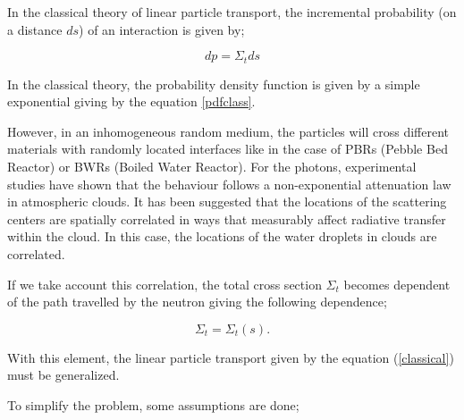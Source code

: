 \documentclass[a4paper, 12pt]{report}
\begin{document}
In the classical theory of linear particle transport, the incremental probability (on a distance $ds$) of an interaction is given by;

\begin{equation}
dp = \Sigma_t ds
\end{equation}

In the classical theory, the probability density function is given by a simple exponential giving by the equation \ref{pdfclass}.

However, in an inhomogeneous random medium, the particles will cross different materials with randomly located interfaces like in the case of PBRs (Pebble Bed Reactor) or BWRs (Boiled Water Reactor). For the photons, experimental studies have shown that the behaviour follows a non-exponential attenuation law in atmospheric clouds. It has been suggested that the locations of the scattering centers are spatially correlated in ways that measurably affect radiative transfer within the cloud. In this case, the locations of the water droplets in clouds are correlated.

If we take account this correlation, the total cross section $\Sigma_t$ becomes dependent of the path travelled by the neutron giving the following dependence;

\begin{equation}
\Sigma_t = \Sigma_t(s).
\end{equation}

With this element, the linear particle transport given by the equation (\ref{classical}) must be generalized.

To simplify the problem, some assumptions are done;
\end{document}
